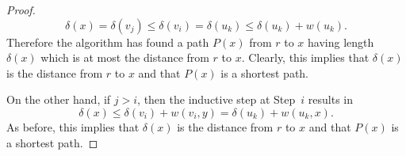 \documentclass[10pt,]{book}
\theoremstyle{plain}
\theoremstyle{definition}
\theoremstyle{definition}
\theoremstyle{definition}
\theoremstyle{definition}
\numberwithin{equation}{section}
\begin{document}
\begin{proof}
\begin{equation*}
\delta(x)= \delta(v_j)\le \delta(v_i)= \delta(u_k)\le
\delta(u_k)+w(u_k).
\end{equation*}
Therefore the algorithm has found a path \(P(x)\) from \(r\) to \(x\) having length \(\delta(x)\) which is at most the distance from \(r\) to \(x\). Clearly, this implies that \(\delta(x)\) is the distance from \(r\) to \(x\) and that \(P(x)\) is a shortest path.%
\par
\hypertarget{p-223}{}%
On the other hand, if \(j>i\), then the inductive step at Step~\(i\) results in%
\begin{equation*}
\delta(x)\le \delta(v_i)+w(v_i,y)=\delta(u_k)+w(u_k,x).
\end{equation*}
As before, this implies that \(\delta(x)\) is the distance from \(r\) to \(x\) and that \(P(x)\) is a shortest path.%
\end{proof}
\typeout{************************************************}
\typeout{************************************************}
\end{document}
